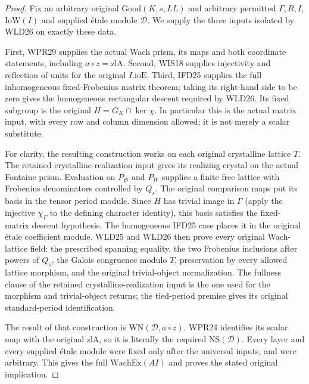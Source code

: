 \documentclass[11pt,a4paper]{article}
\numberwithin{equation}{section}
\theoremstyle{remark}\newtheorem{remark}[theorem]{Remark}
\begin{document}
\begin{proof}
Fix an arbitrary original $\mathrm{Good}(K,s,LL)$ and arbitrary
permitted $\Gamma,R,I$, $\mathrm{IoW}(I)$ and supplied \'etale
module $\mathcal D$. We supply the three inputs isolated by
WLD26 on exactly these data.

First, WPR29 supplies the actual Wach prism, its maps and
both coordinate statements, including $a\circ z=\mathrm{zlA}$.
Second, WIS18 supplies injectivity and reflection of units
for the original $I.\mathrm{ioE}$. Third, IFD25 supplies the
full inhomogeneous fixed-Frobenius matrix theorem; taking its
right-hand side to be zero gives the homogeneous rectangular
descent required by WLD26. Its fixed subgroup is the original
$H=G_K\cap\ker\chi$. In particular this is the actual matrix
input, with every row and column dimension allowed; it is not
merely a scalar substitute.

For clarity, the resulting construction works on each original
crystalline lattice $T$. The retained crystalline-realization
input gives its realizing crystal on the actual Fontaine prism.
Evaluation on $P_{\mathfrak S}$ and $P_W$ supplies a finite
free lattice with Frobenius denominators controlled by $Q_s$.
The original comparison maps put its basis in the tensor period
module. Since $H$ has trivial image in $\Gamma$ (apply the
injective $\chi_\Gamma$ to the defining character identity),
this basis satisfies the fixed-matrix descent hypothesis. The
homogeneous IFD25 case places it in the original \'etale
coefficient module. WLD25 and WLD26 then prove every original
Wach-lattice field: the prescribed spanning equality, the two
Frobenius inclusions after powers of $Q_s$, the Galois
congruence modulo $T$, preservation by every allowed lattice
morphism, and the original trivial-object normalization. The
fullness clause of the retained crystalline-realization input
is the one used for the morphism and trivial-object returns;
the tied-period premise gives its original standard-period
identification.

The result of that construction is $\mathrm{WN}(\mathcal D,a\circ z)$.
WPR24 identifies its scalar map with the original $\mathrm{zlA}$,
so it is literally the required $\mathrm{NS}(\mathcal D)$.
Every layer and every supplied \'etale module were fixed only
after the universal inputs, and were arbitrary. This gives
the full $\mathrm{WachEx}(AI)$ and proves the stated original
implication.
\end{proof}
\end{document}
